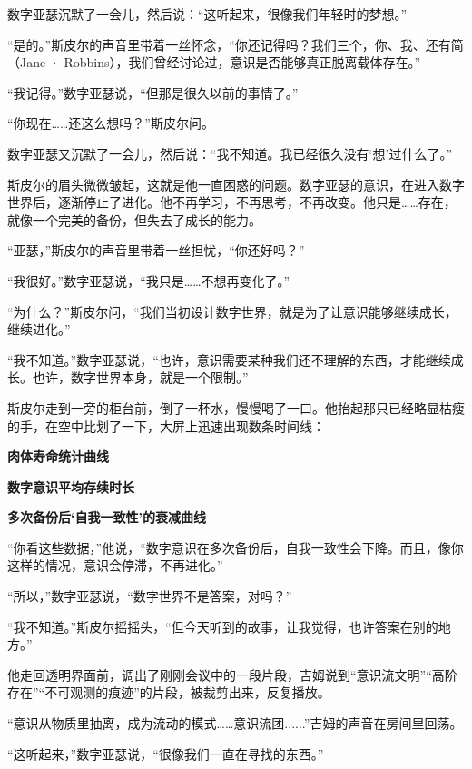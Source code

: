 数字亚瑟沉默了一会儿，然后说：“这听起来，很像我们年轻时的梦想。”

“是的。”斯皮尔的声音里带着一丝怀念，“你还记得吗？我们三个，你、我、还有简（Jane · Robbins），我们曾经讨论过，意识是否能够真正脱离载体存在。”

“我记得。”数字亚瑟说，“但那是很久以前的事情了。”

“你现在……还这么想吗？”斯皮尔问。

数字亚瑟又沉默了一会儿，然后说：“我不知道。我已经很久没有‘想’过什么了。”

斯皮尔的眉头微微皱起，这就是他一直困惑的问题。数字亚瑟的意识，在进入数字世界后，逐渐停止了进化。他不再学习，不再思考，不再改变。他只是……存在，就像一个完美的备份，但失去了成长的能力。

“亚瑟，”斯皮尔的声音里带着一丝担忧，“你还好吗？”

“我很好。”数字亚瑟说，“我只是……不想再变化了。”

“为什么？”斯皮尔问，“我们当初设计数字世界，就是为了让意识能够继续成长，继续进化。”

“我不知道。”数字亚瑟说，“也许，意识需要某种我们还不理解的东西，才能继续成长。也许，数字世界本身，就是一个限制。”

斯皮尔走到一旁的柜台前，倒了一杯水，慢慢喝了一口。他抬起那只已经略显枯瘦的手，在空中比划了一下，大屏上迅速出现数条时间线：

\begin{center}
\textbf{肉体寿命统计曲线}
\end{center}

\begin{center}
\textbf{数字意识平均存续时长}
\end{center}

\begin{center}
\textbf{多次备份后‘自我一致性’的衰减曲线}
\end{center}

“你看这些数据，”他说，“数字意识在多次备份后，自我一致性会下降。而且，像你这样的情况，意识会停滞，不再进化。”

“所以，”数字亚瑟说，“数字世界不是答案，对吗？”

“我不知道。”斯皮尔摇摇头，“但今天听到的故事，让我觉得，也许答案在别的地方。”

他走回透明界面前，调出了刚刚会议中的一段片段，吉姆说到“意识流文明”“高阶存在”“不可观测的痕迹”的片段，被裁剪出来，反复播放。

“意识从物质里抽离，成为流动的模式……意识流团......”吉姆的声音在房间里回荡。

“这听起来，”数字亚瑟说，“很像我们一直在寻找的东西。”

